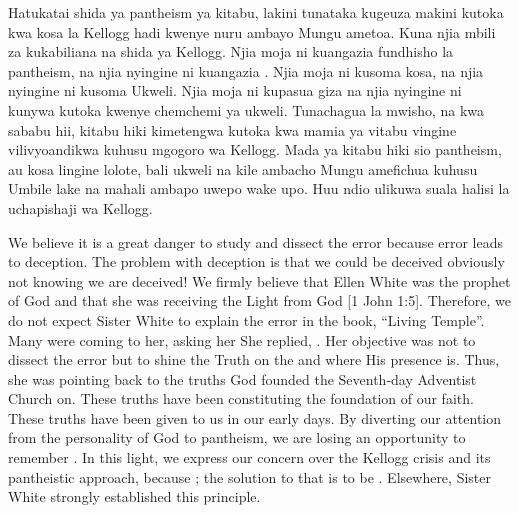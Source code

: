 Hatukatai shida ya pantheism ya kitabu, lakini tunataka kugeuza makini kutoka kwa kosa la Kellogg hadi kwenye nuru ambayo Mungu ametoa. Kuna njia mbili za kukabiliana na shida ya Kellogg. Njia moja ni kuangazia fundhisho la pantheism, na njia nyingine ni kuangazia . Njia moja ni kusoma kosa, na njia nyingine ni kusoma Ukweli. Njia moja ni kupasua giza na njia nyingine ni kunywa kutoka kwenye chemchemi ya ukweli. Tunachagua la mwisho, na kwa sababu hii, kitabu hiki kimetengwa kutoka kwa mamia ya vitabu vingine vilivyoandikwa kuhusu mgogoro wa Kellogg. Mada ya kitabu hiki sio pantheism, au kosa lingine lolote, bali ukweli na kile ambacho Mungu amefichua kuhusu Umbile lake na mahali ambapo uwepo wake upo. Huu ndio ulikuwa suala halisi la uchapishaji wa Kellogg.


We believe it is a great danger to study and dissect the error because error leads to deception. The problem with deception is that we could be deceived obviously not knowing we are deceived! We firmly believe that Ellen White was the prophet of God and that she was receiving the Light from God [1 John 1:5]. Therefore, we do not expect Sister White to explain the error in the book, “Living Temple”. Many were coming to her, asking her  She replied, . Her objective was not to dissect the error but to shine the Truth on the  and where His presence is. Thus, she was pointing back to the truths God founded the Seventh-day Adventist Church on. These truths have been constituting the foundation of our faith. These truths have been given to us in our early days. By diverting our attention from the personality of God to pantheism, we are losing an opportunity to remember . In this light, we express our concern over the Kellogg crisis and its pantheistic approach, because ; the solution to that is to be . Elsewhere, Sister White strongly established this principle.


